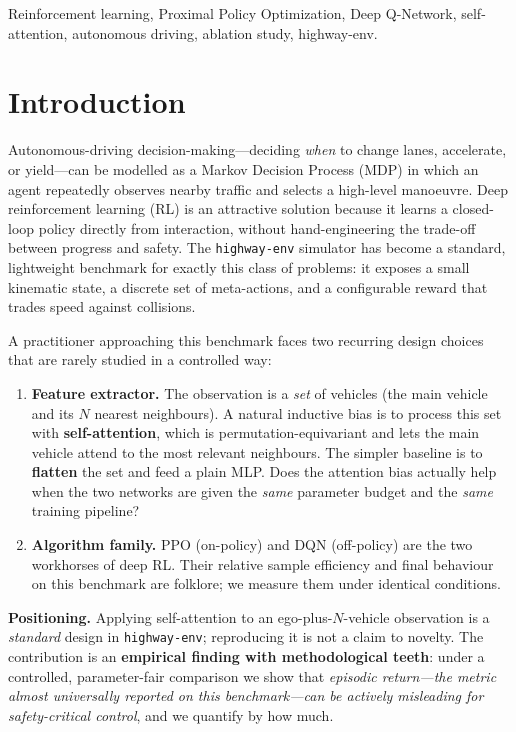 \documentclass[conference]{IEEEtran}
\newcommand{\code}[1]{\texttt{#1}}
\begin{document}
\begin{IEEEkeywords}
Reinforcement learning, Proximal Policy Optimization, Deep Q-Network,
self-attention, autonomous driving, ablation study, highway-env.
\end{IEEEkeywords}

\section{Introduction}
Autonomous-driving decision-making---deciding \emph{when} to change lanes,
accelerate, or yield---can be modelled as a Markov Decision Process (MDP) in
which an agent repeatedly observes nearby traffic and selects a high-level
manoeuvre. Deep reinforcement learning (RL) is an attractive solution because
it learns a closed-loop policy directly from interaction, without
hand-engineering the trade-off between progress and safety. The
\code{highway-env} simulator has become a standard, lightweight benchmark for
exactly this class of problems: it exposes a small kinematic state, a discrete
set of meta-actions, and a configurable reward that trades speed against
collisions.

A practitioner approaching this benchmark faces two recurring design choices
that are rarely studied in a controlled way:
\begin{enumerate}
\item \textbf{Feature extractor.} The observation is a \emph{set} of vehicles
(the main vehicle and its $N$ nearest neighbours). A natural inductive bias is
to process this set with \textbf{self-attention}, which is
permutation-equivariant and lets the main vehicle attend to the most relevant
neighbours. The simpler baseline is to \textbf{flatten} the set and feed a
plain MLP. Does the attention bias actually help when the two networks are given
the \emph{same} parameter budget and the \emph{same} training pipeline?
\item \textbf{Algorithm family.} PPO (on-policy) and DQN (off-policy) are the
two workhorses of deep RL. Their relative sample efficiency and final behaviour
on this benchmark are folklore; we measure them under identical conditions.
\end{enumerate}

\textbf{Positioning.} Applying self-attention to an ego-plus-$N$-vehicle
observation is a \emph{standard} design in \code{highway-env}; reproducing it is
not a claim to novelty. The contribution is an \textbf{empirical finding with
methodological teeth}: under a controlled, parameter-fair comparison we show that
\emph{episodic return---the metric almost universally reported on this
benchmark---can be actively misleading for safety-critical control}, and we
quantify by how much.
\end{document}
